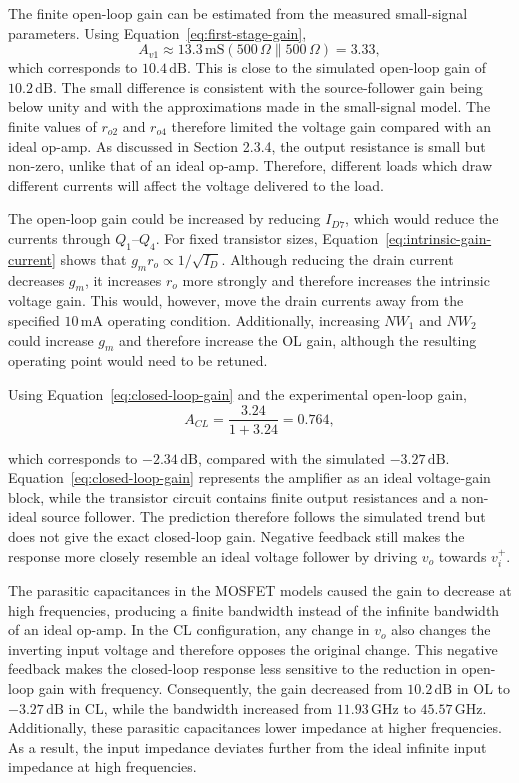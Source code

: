 \documentclass[11pt,a4paper]{article}
\begin{document}
The finite open-loop gain can be estimated from the measured small-signal parameters. 
Using Equation~\eqref{eq:first-stage-gain},
\begin{equation}
    A_{v1}\approx 13.3\,\mathrm{mS}
    \left(500\,\Omega\parallel500\,\Omega\right)
    =3.33,
\end{equation}
which corresponds to $10.4\,\mathrm{dB}$. 
This is close to the simulated open-loop gain of $10.2\,\mathrm{dB}$. 
The small difference is consistent with the source-follower gain being below unity and with the approximations made in the small-signal model. 
The finite values of $r_{o2}$ and $r_{o4}$ therefore limited the voltage gain compared with an ideal op-amp.
As discussed in Section 2.3.4, the output resistance is small but non-zero, unlike that of an ideal op-amp. Therefore, different loads which draw different currents will affect the voltage delivered to the load. 

The open-loop gain could be increased by reducing $I_{D7}$, which would reduce the currents through $Q_1$--$Q_4$. For fixed transistor sizes, Equation~\eqref{eq:intrinsic-gain-current} shows that $g_mr_o\propto1/\sqrt{I_D}$. 
Although reducing the drain current decreases $g_m$, it increases $r_o$ more strongly and therefore increases the intrinsic voltage gain. This would, however, move the drain currents away from the specified $10\,\mathrm{mA}$ operating condition.
Additionally, increasing $NW_1$ and $NW_2$ could increase $g_m$ and therefore increase the OL gain, although the resulting operating point would need to be retuned.

Using Equation~\eqref{eq:closed-loop-gain} and the experimental open-loop gain,
\begin{equation}
    A_{CL} = \frac{3.24}{1 + 3.24}
    =0.764,
\end{equation}

which corresponds to $-2.34\,\mathrm{dB}$, compared with the simulated $-3.27\,\mathrm{dB}$. Equation~\eqref{eq:closed-loop-gain} represents the amplifier as an ideal voltage-gain block, while the transistor circuit contains finite output resistances and a non-ideal source follower. The prediction therefore follows the simulated trend but does not give the exact closed-loop gain. Negative feedback still makes the response more closely resemble an ideal voltage follower by driving $v_o$ towards $v_i^+$.

The parasitic capacitances in the MOSFET models caused the gain to decrease at high frequencies, producing a finite bandwidth instead of the infinite bandwidth of an ideal op-amp. 
In the CL configuration, any change in $v_o$ also changes the inverting input voltage and therefore opposes the original change. 
This negative feedback makes the closed-loop response less sensitive to the reduction in open-loop gain with frequency. 
Consequently, the gain decreased from $10.2\,\mathrm{dB}$ in OL to $-3.27\,\mathrm{dB}$ in CL, while the bandwidth increased from $11.93\,\mathrm{GHz}$ to $45.57\,\mathrm{GHz}$.
Additionally, these parasitic capacitances lower impedance at higher frequencies. As a result, the input impedance deviates further from the ideal infinite input impedance at high frequencies.
\end{document}
